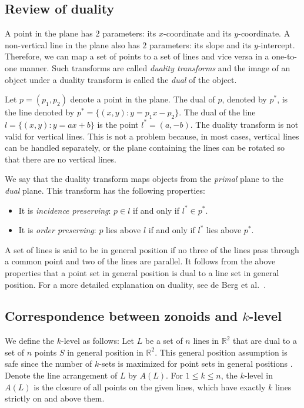 \documentclass[charterfonts,lotsofwhite]{patmorin}
\begin{document}
\subsection{Review of duality}\label{subsection_review_of_duality}

A point in the plane has $2$ parameters: its $x$-coordinate and its
$y$-coordinate. A non-vertical line in the plane also has $2$
parameters: its slope and its $y$-intercept. Therefore, we can map a
set of points to a set of lines and vice versa in a one-to-one manner.
Such transforms are called \emph{duality transforms} and the image of
an object under a duality transform is called the \emph{dual} of the
object. 

Let $p = (p_1, p_2)$ denote a point in the plane. The dual of $p$,
denoted by $p^*$, is the line denoted by $p^* = \{(x,y) : y = p_1x -
p_2\}$. The dual of the line $l = \{(x,y) : y = ax + b\}$ is the point
$l^* = (a,-b)$.  The duality transform is not valid for vertical
lines. This is not a problem because, in most cases, vertical lines
can be handled separately, or the plane containing the lines can be
rotated so that there are no vertical lines. 

We say that the duality transform maps objects from the \emph{primal}
plane to the \emph{dual} plane. This transform has the following
properties:

\begin{itemize}
\item It is \emph{incidence preserving}: $p \in l$ if and only if $l^*
\in p^*$.

\item It is \emph{order preserving}: $p$ lies above $l$ if and only if $l^*$ lies above $p^*$.
\end{itemize}

A set of lines is said to be in general position if no three of the
lines pass through a common point and two of the lines are parallel.
It follows from the above properties that a point set in general
position is dual to a line set in general position. For a more
detailed explanation on duality, see de Berg et al.\ \cite{cg_text}.

\subsection{Correspondence between zonoids and $k$-level}\label{subsection_correspondence_between_zonoids_and_klevel}

We define the $k$-level as follows: Let $L$ be a set of $n$ lines in
$\mathbb{R}^2$ that are dual to a set of $n$ points $S$ in general
position in $\mathbb{R}^2$. This general position assumption is safe
since the number of $k$-sets is maximized for point sets in general
positions \cite{improved_bounds_on_planar_ksets_and_klevels}. Denote
the line arrangement of $L$ by $A(L)$. For $1 \le k \le n$, the
$k$-level in $A(L)$ is the closure of all points on the given lines,
which have exactly $k$ lines strictly on and above them. 
\end{document}
